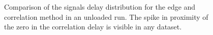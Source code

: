 \begin{figure}[h]
\centering
   \hspace{1mm}
\caption{Comparison of the signals delay distribution for the edge and correlation method in an unloaded run. The spike in proximity of the zero in the correlation delay is visible in any dataset.}
 \label{edge_vs_corr}
 \end{figure}

